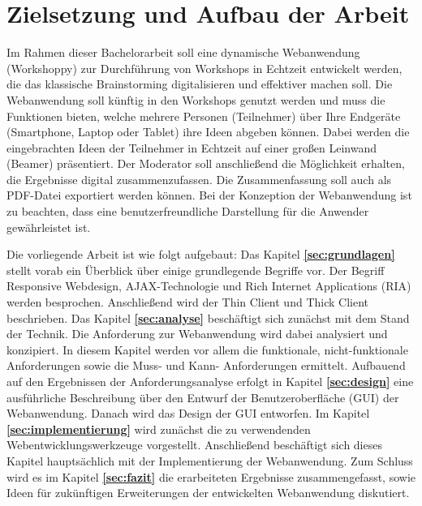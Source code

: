\section{Zielsetzung und Aufbau der Arbeit}
\label{subsec:zielsetzung}
Im Rahmen dieser Bachelorarbeit soll eine dynamische Webanwendung (Workshoppy) zur Durchführung von Workshops in Echtzeit entwickelt werden, die das klassische Brainstorming digitalisieren und effektiver machen soll. Die Webanwendung soll künftig in den Workshops genutzt werden und muss die Funktionen bieten, welche mehrere Personen (Teilnehmer) über Ihre Endgeräte (Smartphone, Laptop oder Tablet) ihre Ideen abgeben können. Dabei werden die eingebrachten Ideen der Teilnehmer in Echtzeit auf einer großen Leinwand (Beamer) präsentiert. Der Moderator soll anschließend die Möglichkeit erhalten, die Ergebnisse digital zusammenzufassen. Die Zusammenfassung soll auch als PDF-Datei exportiert werden können. Bei der Konzeption der Webanwendung ist zu beachten, dass eine benutzerfreundliche Darstellung für die Anwender gewährleistet ist.\bigskip

Die vorliegende Arbeit ist wie folgt aufgebaut: Das Kapitel \textbf{\ref{sec:grundlagen}} stellt vorab ein Überblick über einige grundlegende Begriffe vor. Der Begriff Responsive Webdesign, AJAX-Technologie und Rich Internet Applications (RIA) werden besprochen. Anschließend wird der Thin Client und Thick Client beschrieben. Das Kapitel \textbf{\ref{sec:analyse}} beschäftigt sich zunächst mit dem Stand der Technik. Die Anforderung zur Webanwendung wird dabei analysiert und konzipiert. In diesem Kapitel werden vor allem die funktionale, nicht-funktionale Anforderungen sowie die Muss- und Kann- Anforderungen ermittelt. Aufbauend auf den Ergebnissen der Anforderungsanalyse erfolgt in Kapitel \textbf{\ref{sec:design}} eine ausführliche Beschreibung über den Entwurf der Benutzeroberfläche (GUI) der Webanwendung. Danach wird das Design der GUI entworfen. Im Kapitel \textbf{\ref{sec:implementierung}} wird zunächst die zu verwendenden Webentwicklungswerkzeuge vorgestellt. Anschließend beschäftigt sich dieses Kapitel hauptsächlich mit der Implementierung der Webanwendung. Zum Schluss wird es im Kapitel \textbf{\ref{sec:fazit}} die erarbeiteten Ergebnisse zusammengefasst, sowie Ideen für zukünftigen Erweiterungen der entwickelten Webanwendung diskutiert.
